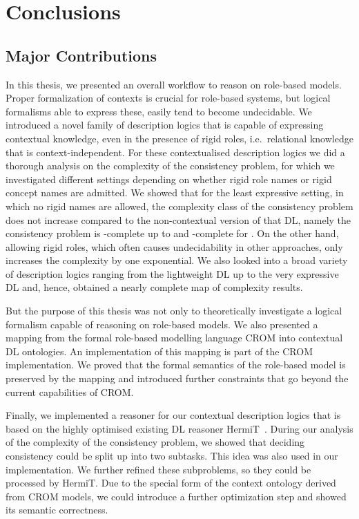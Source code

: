 \chapter{Conclusions}
\label{cha:conclusions}


\section{Major Contributions}
\label{sec:major-contributions}

In this thesis, we presented an overall workflow to reason on role-based models. Proper
formalization of contexts is crucial for role-based systems, but logical formalisms able to express
these, easily tend to become undecidable.  We introduced a novel family of description logics that
is capable of expressing contextual knowledge, even in the presence of rigid roles, i.e.\ relational
knowledge that is context-independent.  For these contextualised description logics we did a
thorough analysis on the complexity of the consistency problem, for which we investigated different
settings depending on whether rigid role names or rigid concept names are admitted. We showed that
for the least expressive setting, in which no rigid names are allowed, the complexity class of the
consistency problem does not increase compared to the non-contextual version of that DL, namely the
consistency problem is \ExpTime-complete up to \SHOQSHOQ and \NExpTime-complete for \SHOIQSHOIQ. On
the other hand, allowing rigid roles, which often causes undecidability in other approaches, only
increases the complexity by one exponential.
%
We also looked into a broad variety of description logics
ranging from the lightweight DL \EL up to the very expressive DL \SHOIQ and, hence, obtained a
nearly complete map of complexity results.

But the purpose of this thesis was not only to theoretically investigate a logical formalism capable
of reasoning on role-based models. We also presented a mapping from the formal role-based modelling
language CROM into contextual DL ontologies. An implementation of this mapping is part of the CROM
implementation. We proved that the formal semantics of the role-based model is preserved
by the mapping and introduced further constraints that go beyond the current capabilities of CROM.

Finally, we implemented a reasoner for our contextual description logics that is based on the highly
optimised existing DL reasoner HermiT~\cite{GHM-JAR14}.  During our analysis of the complexity of
the consistency problem, we showed that deciding consistency could be split up into two
subtasks. This idea was also used in our implementation.  We further refined these subproblems, so
they could be processed by HermiT.  Due to the special form of the context ontology derived from
CROM models, we could introduce a further optimization step and showed its semantic correctness.




